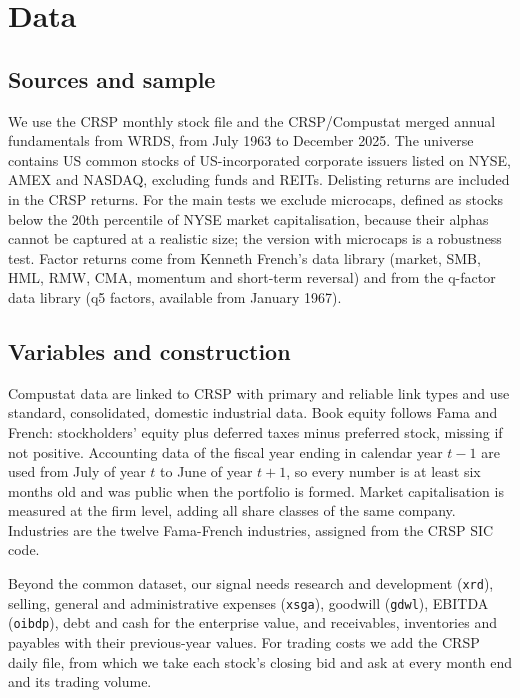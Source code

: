 \documentclass[12pt,a4paper]{article}
\begin{document}
\section{Data}\label{sec:data}

\subsection{Sources and sample}

We use the CRSP monthly stock file and the CRSP/Compustat merged annual fundamentals from WRDS, from
July 1963 to December 2025. The universe contains US common stocks of US-incorporated corporate
issuers listed on NYSE, AMEX and NASDAQ, excluding funds and REITs. Delisting returns are included in
the CRSP returns. For the main tests we exclude microcaps, defined as stocks below the 20th
percentile of NYSE market capitalisation, because their alphas cannot be captured at a realistic
size; the version with microcaps is a robustness test. Factor returns come from Kenneth French's data
library (market, SMB, HML, RMW, CMA, momentum and short-term reversal) and from the q-factor data
library (q5 factors, available from January 1967).

\subsection{Variables and construction}

Compustat data are linked to CRSP with primary and reliable link types and use standard,
consolidated, domestic industrial data. Book equity follows Fama and French: stockholders' equity
plus deferred taxes minus preferred stock, missing if not positive. Accounting data of the fiscal year
ending in calendar year $t-1$ are used from July of year $t$ to June of year $t+1$, so every number
is at least six months old and was public when the portfolio is formed. Market capitalisation is
measured at the firm level, adding all share classes of the same company. Industries are the twelve
Fama-French industries, assigned from the CRSP SIC code.

Beyond the common dataset, our signal needs research and development (\texttt{xrd}), selling,
general and administrative expenses (\texttt{xsga}), goodwill (\texttt{gdwl}), EBITDA
(\texttt{oibdp}), debt and cash for the enterprise value, and receivables, inventories and payables
with their previous-year values. For trading costs we add the CRSP daily file, from which we take
each stock's closing bid and ask at every month end and its trading volume.
\end{document}
